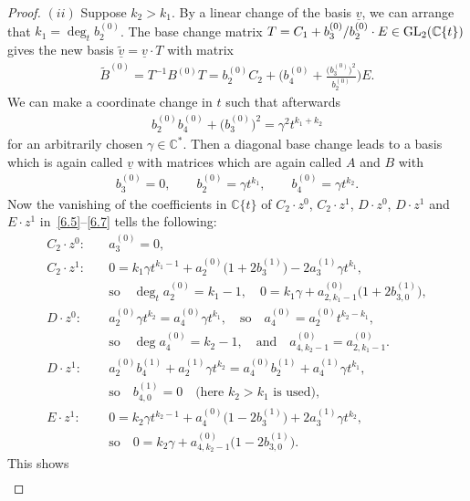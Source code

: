 \documentclass[pdftex]{sigma}%
\numberwithin{equation}{section}
\numberwithin{figure}{section}
\newcommand{\C}{{\mathbb C}}
\newcommand{\www}{\widetilde}
\newcommand{\uuuu}{\underline}
\begin{document}
\begin{proof}
\medskip
$(ii)$ Suppose $k_2>k_1$.
By a linear change of the basis $\uuuu{v}$, we can arrange
that $k_1=\deg_tb_2^{(0)}$. The base change matrix
$T=C_1+b_3^{(0)}/b_2^{(0)}\cdot E\in {\rm GL}_2(\C\{t\})$
gives the new basis $\uuuu{\www v}=\uuuu{v}\cdot T$
with matrix
\begin{gather*}
\www B^{(0)}=T^{-1}B^{(0)}T=b_2^{(0)}C_2+
\bigg(b_4^{(0)}+\frac{\big(b_3^{(0)}\big)^2}{b_2^{(0)}}\bigg)E.
\end{gather*}
We can make a coordinate change in $t$ such that afterwards
\begin{gather*}
b_2^{(0)}b_4^{(0)}+\big(b_3^{(0)}\big)^2=\gamma^2 t^{k_1+k_2}
\end{gather*}
for an arbitrarily chosen $\gamma\in\C^*$.
Then a diagonal base change leads to a basis
which is again called $\uuuu{v}$ with matrices
which are again called $A$ and $B$ with
\begin{gather*}%
b_3^{(0)}=0,\qquad
b_2^{(0)}=\gamma t^{k_1},\qquad
b_4^{(0)}=\gamma t^{k_2}.
\end{gather*}
Now the vanishing of the coefficients in $\C\{t\}$ of
$C_2\cdot z^0$, $C_2\cdot z^1$, $D\cdot z^0$, $D\cdot z^1$
and $E\cdot z^1$ in~\eqref{6.5}--\eqref{6.7}
tells the following:
\begin{align*}
C_2\cdot z^0\colon \quad &a_3^{(0)}=0,
\\
C_2\cdot z^1\colon \quad &0=k_1\gamma t^{k_1-1}+a_2^{(0)}\big(1+2b_3^{(1)}\big)
-2a_3^{(1)}\gamma t^{k_1},
\\
&\text{so}\quad \deg_t a_2^{(0)}=k_1-1,\quad
0=k_1\gamma +a_{2,k_1-1}^{(0)}\big(1+2b_{3,0}^{(1)}\big),
\\
D\cdot z^0\colon\quad &a_2^{(0)}\gamma t^{k_2}=a_4^{(0)}\gamma t^{k_1},
\quad\text{so}\quad a_4^{(0)}=a_2^{(0)}t^{k_2-k_1},
\\
&\text{so}\quad \deg a_4^{(0)}=k_2-1,\quad\text{and}\quad
a_{4,k_2-1}^{(0)}=a_{2,k_1-1}^{(0)}.
\\
D\cdot z^1\colon\quad &a_2^{(0)}b_4^{(1)}+a_2^{(1)}\gamma t^{k_2}
=a_4^{(0)}b_2^{(1)}+a_4^{(1)}\gamma t^{k_1},
\\
&\text{so}\quad b_{4,0}^{(1)}=0 \quad \text{(here }
k_2>k_1\text{ is used)},
\\
E\cdot z^1\colon\quad & 0=k_2\gamma t^{k_2-1}+a_4^{(0)}\big(1-2b_3^{(1)}\big)
+2a_3^{(1)}\gamma t^{k_2},
\\
&\text{so}\quad 0=k_2\gamma +a_{4,k_2-1}^{(0)}\big(1-2b_{3,0}^{(1)}\big).
\end{align*}
This shows
\begin{gather*}%

\end{gather*}
\end{proof}
\end{document}

